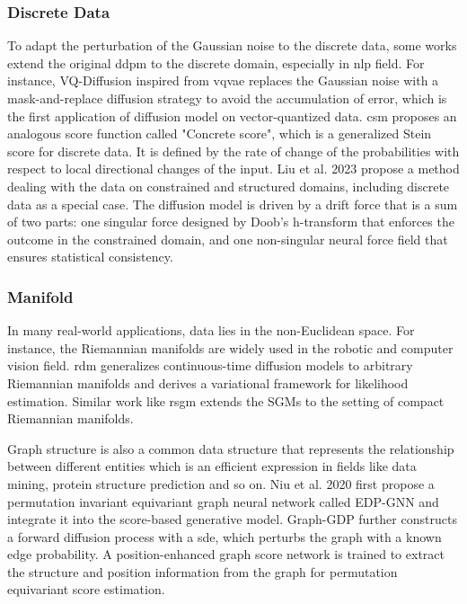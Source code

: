 \documentclass[12pt,DIV14,BCOR12mm,a4paper,footinclude=false,headinclude,parskip=half-,twoside,openright,cleardoublepage=empty,toc=index,bibliography=totoc,listof=totoc]{scrreprt}
\numberwithin{equation}{chapter}
\begin{document}
\subsubsection{Discrete Data}
To adapt the perturbation of the Gaussian noise to the discrete data, some works extend the original \gls{ddpm} to the discrete domain, especially in \gls{nlp} field. For instance, VQ-Diffusion \cite{gu2022vector} inspired from \gls{vqvae} \cite{oord2018neural} replaces the Gaussian noise with a mask-and-replace diffusion strategy to avoid the accumulation of error, which is the first application of diffusion model on vector-quantized data. \gls{csm} \cite{meng2023distillation} proposes an analogous score function called "Concrete score", which is a generalized Stein score for discrete data. It is defined by the rate of change of the probabilities with respect to local directional changes of the input. Liu et al. 2023 \cite{liu2023learning} propose a method dealing with the data on constrained and structured domains, including discrete data as a special case. The diffusion model is driven by a drift force that is a sum of two parts: one singular force designed by Doob's h-transform that enforces the outcome in the constrained domain, and one non-singular neural force field that ensures statistical consistency.
\subsubsection{Manifold}
In many real-world applications, data lies in the non-Euclidean space. For instance, the Riemannian manifolds are widely used in the robotic and computer vision field. \gls{rdm} \cite{huang2022riemannian} generalizes continuous-time diffusion models to arbitrary Riemannian manifolds and derives a variational framework for likelihood estimation. Similar work like \gls{rsgm} \cite{debortoli2022riemannian} extends the SGMs to the setting of compact Riemannian manifolds.

Graph structure is also a common data structure that represents the relationship between different entities which is an efficient expression in fields like data mining,  protein structure prediction and so on. Niu et al. 2020 \cite{niu2020permutation} first propose a permutation invariant equivariant graph neural network called EDP-GNN and integrate it into the score-based generative model. Graph-GDP \cite{huang2022graphgdp} further constructs a forward diffusion process with a \gls{sde}, which perturbs the graph with a known edge probability. A position-enhanced graph score network is trained to extract the structure and position information from the graph for permutation equivariant score estimation.
\end{document}
